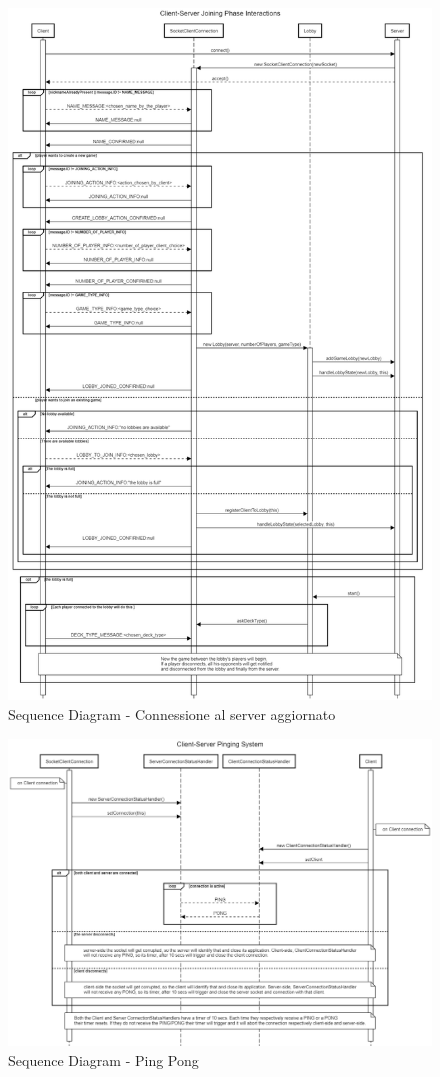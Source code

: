 \documentclass[a4paper, 12pt]{article}
\begin{document}
	\newpage
	\begin{figure}[h!]
		\centering
		\includegraphics[scale=0.27]{ClientServerJoiningPhaseInteraction1.png}
		\caption{Sequence Diagram - Connessione al server aggiornato}
		\label{fig:sequence_join}
	\end{figure}
	\newpage
	\begin{figure}[h!]
		\centering
		\includegraphics[scale=0.3]{PingingSystem.png}
		\caption{Sequence Diagram - Ping Pong}
		\label{fig:sequence_pingpong}
	\end{figure}
\end{document}
